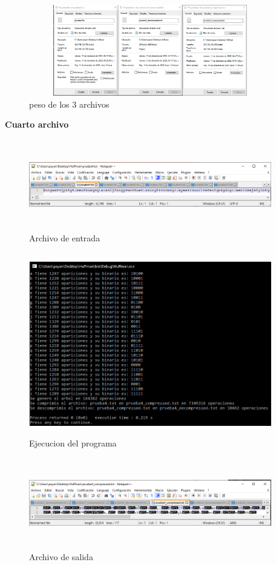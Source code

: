 \documentclass[spanish]{article}
\begin{document}
	\begin{figure}[H]
		\centering
		\includegraphics[width=400px,height=150px]{captura25}
		\caption{peso de los 3 archivos}
	\end{figure}
	\textbf{Cuarto archivo}
	\begin{figure}[H]
		\centering
		\includegraphics[width=400px,height=150px]{captura26}
		\caption{Archivo de entrada}
	\end{figure}
	\begin{figure}[H]
		\centering
		\includegraphics[width=400px,height=300px]{captura27}
		\caption{Ejecucion del programa}
	\end{figure}
	\begin{figure}[H]
		\centering
		\includegraphics[width=400px,height=150px]{captura28}
		\caption{Archivo de salida}
	\end{figure}
\end{document}
